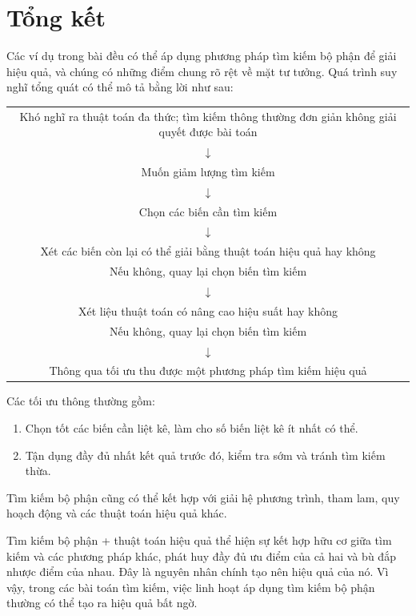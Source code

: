 \documentclass[11pt]{article}
\begin{document}
\section{Tổng kết}

Các ví dụ trong bài đều có thể áp dụng phương pháp tìm kiếm bộ phận để giải
hiệu quả, và chúng có những điểm chung rõ rệt về mặt tư tưởng. Quá trình suy
nghĩ tổng quát có thể mô tả bằng lời như sau:

\begin{center}
\begin{tabular}{c}
Khó nghĩ ra thuật toán đa thức; tìm kiếm thông thường đơn giản không giải
quyết được bài toán\\
$\downarrow$\\
Muốn giảm lượng tìm kiếm\\
$\downarrow$\\
Chọn các biến cần tìm kiếm\\
$\downarrow$\\
Xét các biến còn lại có thể giải bằng thuật toán hiệu quả hay không\\
\quad Nếu không, quay lại chọn biến tìm kiếm\\
$\downarrow$\\
Xét liệu thuật toán có nâng cao hiệu suất hay không\\
\quad Nếu không, quay lại chọn biến tìm kiếm\\
$\downarrow$\\
Thông qua tối ưu thu được một phương pháp tìm kiếm hiệu quả
\end{tabular}
\end{center}

Các tối ưu thông thường gồm:
\begin{enumerate}
  \item Chọn tốt các biến cần liệt kê, làm cho số biến liệt kê ít nhất có thể.
  \item Tận dụng đầy đủ nhất kết quả trước đó, kiểm tra sớm và tránh tìm kiếm
  thừa.
\end{enumerate}

Tìm kiếm bộ phận cũng có thể kết hợp với giải hệ phương trình, tham lam, quy
hoạch động và các thuật toán hiệu quả khác.

Tìm kiếm bộ phận + thuật toán hiệu quả thể hiện sự kết hợp hữu cơ giữa tìm
kiếm và các phương pháp khác, phát huy đầy đủ ưu điểm của cả hai và bù đắp
nhược điểm của nhau. Đây là nguyên nhân chính tạo nên hiệu quả của nó. Vì vậy,
trong các bài toán tìm kiếm, việc linh hoạt áp dụng tìm kiếm bộ phận thường
có thể tạo ra hiệu quả bất ngờ.
\end{document}
